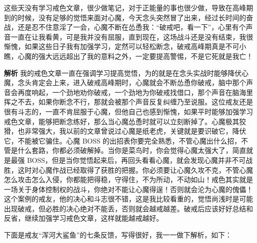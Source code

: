 \begin{case}[研究心魔的特点]
    这些天没有学习戒色文章，很少做笔记，对于正能量的事也很少做，导致在高峰期到的时候，没有足够的觉悟来面对心魔，今天念头突然冒了出来，经过长时间的奋战，还是忍不住意淫了一会，心魔不断在怂恿我：“破戒吧，看一下”，心里有个声音一直在让我看黄，可是我并没有屈服，直到现在，这场战斗还是没有结束，我很惭愧，如果这些日子我有加强学习，定然可以轻松断念，破戒高峰期真是不可小瞧，心魔的强大远远超出了我的意料之外，一定要提高警惕，不是它死就是我亡！

    \textbf{解析} 我的戒色文章一直在强调学习提高觉悟，为的就是在念头实战时能够降伏心魔，念头肯定会上来，进入破戒高峰期时，心魔就会不断怂恿你破戒，脑中那个声音会再度响起，一个劲地劝你破戒，一个劲地为你破戒找借口，那个声音在脑海里挥之不去，如果你断念不行，那就会被那个声音反复纠缠乃至说服。这位戒友还是很有斗志的，一直不肯屈服于心魔，但他自己也感到惭愧，如果平时能够加强学习戒色文章，能够把断念练好，那么当心魔怂恿时就可以立刻断掉了。心魔极其狡猾，也非常强大，我以前的文章曾说过心魔是纸老虎，关键就是要识破它，降伏它，不能被它骗住。心魔 BOSS 的出招表你要完全熟悉，不管心魔出什么招，不管是什么套路，你都必须破解掉。当你是菜鸟时，你会觉得心魔太强大了，简直就是最强 BOSS，但是当你觉悟起来后，再回头看看心魔，就会发现心魔并非不可战胜，这时对心魔作战已经取得了获胜的把握。你必须要让心魔久攻不克，不管心魔怎么攻击怎么入侵，你都能把得稳，守得住，不为所动，不动如山！戒色其实就是一场关于身体控制权的战斗，你绝对不能让心魔得逞！否则就会沦为心魔的傀儡！这个案例的戒友，他的决心和斗志很不错，这是我比较看重的，觉悟尚浅时是可能出现破戒，但必胜的决心绝对不能丢，否则就会越戒越差。破戒后应该好好总结和反省，继续加强学习戒色文章，这样就能越戒越好。
\end{case}

下面是戒友“浑河大鲨鱼”的七条反馈，写得很好，我一一做下解析，如下：

